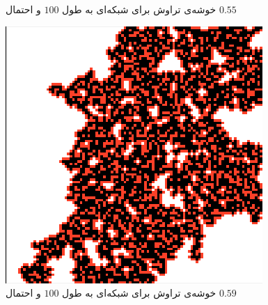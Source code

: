 \documentclass[11pt, a4paper]{article}
\begin{document}
\begin{figure}[h]
\begin{minipage}[b]{0.3\textwidth}
    \caption{خوشه‌ی تراوش برای شبکه‌ای به طول $100$ و احتمال $0.55$}
    \label{fig:q7_100_0.55}
  \end{minipage}
  \hfill
  \begin{minipage}[b]{0.3\textwidth}
    \includegraphics[width=\textwidth]{q7_100_0.59}
    \caption{خوشه‌ی تراوش برای شبکه‌ای به طول $100$ و احتمال $0.59$}
    \label{fig:q7_100_0.59}
  \end{minipage}
\end{figure}
\end{document}
